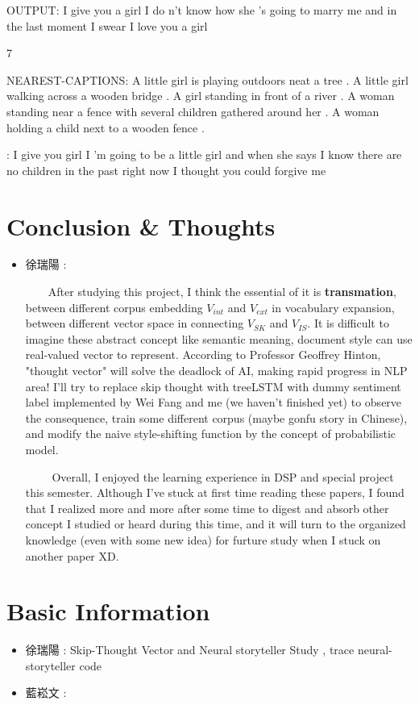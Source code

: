 \documentclass{article}
\begin{document}
OUTPUT:
I give you a girl
I do n't know how she 's going to marry me
and
in the last moment
I swear
I love you a girl

7

NEAREST-CAPTIONS:
A little girl is playing outdoors neat a tree .
A little girl walking across a wooden bridge .
A girl standing in front of a river .
A woman standing near a fence with several children gathered around her .
A woman holding a child next to a wooden fence .

:
I give you girl
I 'm going to be a little girl
and when she says
I know there are no children in the past
right now
I thought you could forgive me

\section{Conclusion \& Thoughts}
\begin{itemize}
	\item 徐瑞陽 : 
	\par~~~~After studying this project, I think the essential of it is \textbf{transmation}, between different corpus embedding $V_{int}$ and $V_{ext}$ in vocabulary expansion, between different vector space in connecting $V_{SK}$ and $V_{IS}$. It is difficult to imagine these abstract concept like semantic meaning, document style can use real-valued vector to represent. According to Professor Geoffrey Hinton, "thought vector" will solve the deadlock of AI, making rapid progress in NLP area! I'll try to replace skip thought with treeLSTM with dummy sentiment label implemented by Wei Fang and me (we haven't finished yet) to observe the consequence, train some different corpus (maybe gonfu story in Chinese), and modify the naive style-shifting function by the concept of probabilistic model.
	\par~~~~ Overall, I enjoyed the learning experience in DSP and special project this semester. Although I've stuck at first time reading these papers, I found that I realized more and more after some time to digest and absorb other concept I studied or heard during this time, and it will turn to the organized knowledge (even with some new idea) for furture study when I stuck on another paper XD.
\end{itemize}

\section{Basic Information}
\begin{itemize}
    \item 徐瑞陽 : Skip-Thought Vector and Neural storyteller Study , trace neural-storyteller code
    \item 藍崧文 : 
\end{itemize}
\medskip



\end{document}
